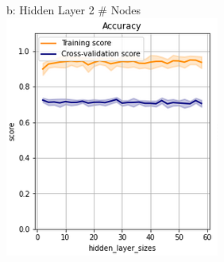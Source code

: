 \documentclass{article}
\begin{document}
\begin{figure}
\begin{subfigure}{.24\textwidth}
	\end{subfigure}
	\begin{subfigure}{.24\textwidth}
		\centering
		b: Hidden Layer 2 \# Nodes
		\includegraphics[width=\linewidth]{poland_nn_hidden_layer_2_size_2_60_accuracy.png}
		

\end{subfigure}
\end{figure}
\end{document}
